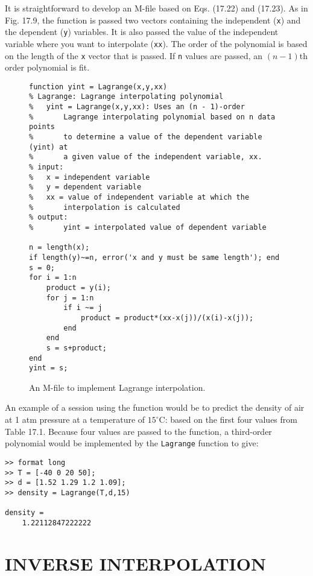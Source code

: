 \documentclass[../main.tex]{subfiles}
\begin{document}
\noindent It is straightforward to develop an M-file based on Eqs. (17.22) and (17.23). As in
Fig. 17.9, the function is passed two vectors containing the independent (\texttt{x}) and the
dependent (\texttt{y}) variables. It is also passed the value of the independent variable where you
want to interpolate (\texttt{xx}). The order of the polynomial is based on the length of the \texttt{x} vector
that is passed. If \texttt{n} values are passed, an $(n - 1)$th order polynomial is fit.

\begin{figure}[H] 
	\centering
	\begin{lstlisting}[numbers=none]
function yint = Lagrange(x,y,xx)
% Lagrange: Lagrange interpolating polynomial
% 	yint = Lagrange(x,y,xx): Uses an (n - 1)-order
% 		Lagrange interpolating polynomial based on n data points
% 		to determine a value of the dependent variable (yint) at
% 		a given value of the independent variable, xx.
% input:
% 	x = independent variable
% 	y = dependent variable
% 	xx = value of independent variable at which the
% 		interpolation is calculated
% output:
% 		yint = interpolated value of dependent variable

n = length(x);
if length(y)~=n, error('x and y must be same length'); end
s = 0;
for i = 1:n
	product = y(i);
	for j = 1:n
		if i ~= j
			product = product*(xx-x(j))/(x(i)-x(j));
		end
	end
	s = s+product;
end
yint = s;
	\end{lstlisting}
	\caption{\textsf{An M-file to implement Lagrange interpolation.}}
	\label{fig:fig_17_9}
\end{figure}

An example of a session using the function would be to predict the density of air at
1 atm pressure at a temperature of $15^\circ$C: based on the first four values from Table 17.1.
Because four values are passed to the function, a third-order polynomial would be implemented by the \texttt{Lagrange} function to give:

\begin{lstlisting}[numbers=none]
>> format long
>> T = [-40 0 20 50];
>> d = [1.52 1.29 1.2 1.09];
>> density = Lagrange(T,d,15)

density =
	1.22112847222222
\end{lstlisting}

\label{cha:cha_P_17_4} %
\section{INVERSE INTERPOLATION}
\end{document}
